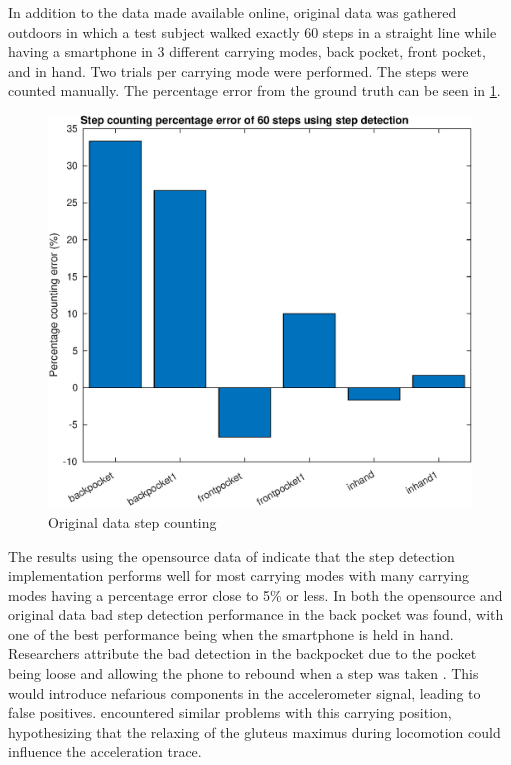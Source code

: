 In addition to the data made available online, original data was gathered outdoors in which a test subject walked exactly 60 steps in a straight line while having a smartphone in 3 different carrying modes, back pocket, front pocket, and in hand. Two trials per carrying mode were performed. The steps were counted manually. The percentage error from the ground truth can be seen in \cref{fig:202009291013step_counting_error_of_60_steps}.
\begin{figure}[H]
	\centering
	\includegraphics[width=0.6\linewidth]{images/20201127_1640_Step_counting_percentage_error_of_60_steps_using_step_detection}
	\caption{Original data step counting}
	\label{fig:202009291013step_counting_error_of_60_steps}
\end{figure}

The results using the opensource data of \citet{Salvi2018} indicate that the step detection implementation performs well for most carrying modes with many carrying modes having a percentage error close to 5\% or less. In both the opensource and original data bad step detection performance in the back pocket was found, with one of the best performance being when the smartphone is held in hand. Researchers attribute the bad detection in the backpocket due to the pocket being loose and allowing the phone to rebound when a step was taken \cite{Salvi2018}. This would introduce nefarious components in the accelerometer signal, leading to false positives. \citet{Brajdic2013} encountered similar problems with this carrying position, hypothesizing that the relaxing of the gluteus maximus during locomotion could influence the acceleration trace.\par

